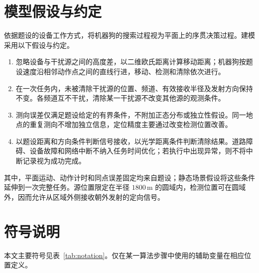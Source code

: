\documentclass[withoutpreface,bwprint]{cumcmthesis} %
\begin{document}
\section{模型假设与约定}
依据题设的设备工作方式，将机器狗的搜索过程视为平面上的序贯决策过程。建模采用以下假设与约定。
\begin{enumerate}
 \item 忽略设备与干扰源之间的高度差，以二维欧氏距离计算移动距离；机器狗按题设速度沿相邻动作点之间的直线行进，移动、检测和清除依次进行。
 \item 在一次任务内，未被清除干扰源的位置、频道、有效接收半径及发射方向保持不变。各频道互不干扰，清除某一干扰源不改变其他源的观测条件。
 \item 测向误差仅满足题设给定的有界条件，不附加正态分布或独立性假设。同一地点的重复测向不增加独立信息，定位精度主要通过改变检测位置改善。
 \item 以题设距离和方向条件判断信号接收，以光学距离条件判断清除结果。道路障碍、设备故障和网络中断不纳入任务时间优化；若执行中出现异常，则不将中断记录视为成功完成。
\end{enumerate}
其中，平面运动、动作计时和同点误差固定均来自题设；静态场景假设将这些条件延伸到一次完整任务。源位置限定在半径 $1800\,\mathrm m$ 的圆域内，检测位置可在圆域外，因而允许从区域外侧接收朝外发射的定向信号。

\section{符号说明}
本文主要符号见表~\ref{tab:notation}。仅在某一算法步骤中使用的辅助变量在相应位置定义。
\end{document}

